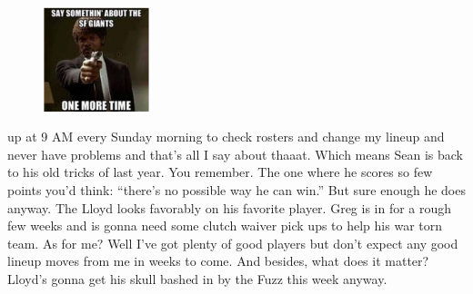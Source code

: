 \documentclass[11pt,letterpaper]{article}
\begin{document}
\begin{figure}
\centering
\includegraphics[width=0.275\textwidth]{week3-giants.png}
\label{fig:week3-giants}
\end{figure} 
\par\noindent up at 9 AM every Sunday morning to check rosters and change my lineup and never have problems and that's all I say about thaaat. Which means Sean is back to his old tricks of last year. You remember. The one where he scores so few points you'd think: ``there's no possible way he can win.'' But sure enough he does anyway. The Lloyd looks favorably on his favorite player. Greg is in for a rough few weeks and is gonna need some clutch waiver pick ups to help his war torn team. As for me? Well I've got plenty of good players but don't expect any good lineup moves from me in weeks to come. And besides, what does it matter? Lloyd's gonna get his skull bashed in by the Fuzz this week anyway.
\end{document}
